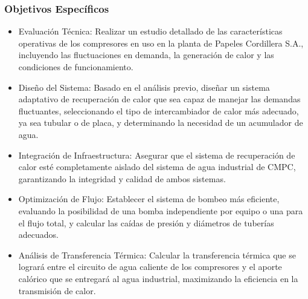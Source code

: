 \documentclass[11pt,a4paper]{article}  %
\begin{document}
\subsubsection{Objetivos Específicos}
\begin{itemize}
\item Evaluación Técnica: Realizar un estudio detallado de las características operativas de los compresores en uso en la planta de Papeles Cordillera S.A., incluyendo las fluctuaciones en demanda, la generación de calor y las condiciones de funcionamiento.
\item Diseño del Sistema: Basado en el análisis previo, diseñar un sistema adaptativo de recuperación de calor que sea capaz de manejar las demandas fluctuantes, seleccionando el tipo de intercambiador de calor más adecuado, ya sea tubular o de placa, y determinando la necesidad de un acumulador de agua.
\item Integración de Infraestructura: Asegurar que el sistema de recuperación de calor esté completamente aislado del sistema de agua industrial de CMPC, garantizando la integridad y calidad de ambos sistemas.
\item Optimización de Flujo: Establecer el sistema de bombeo más eficiente, evaluando la posibilidad de una bomba independiente por equipo o una para el flujo total, y calcular las caídas de presión y diámetros de tuberías adecuados.
\item Análisis de Transferencia Térmica: Calcular la transferencia térmica que se logrará entre el circuito de agua caliente de los compresores y el aporte calórico que se entregará al agua industrial, maximizando la eficiencia en la transmisión de calor.
\end{itemize}
\end{document}
